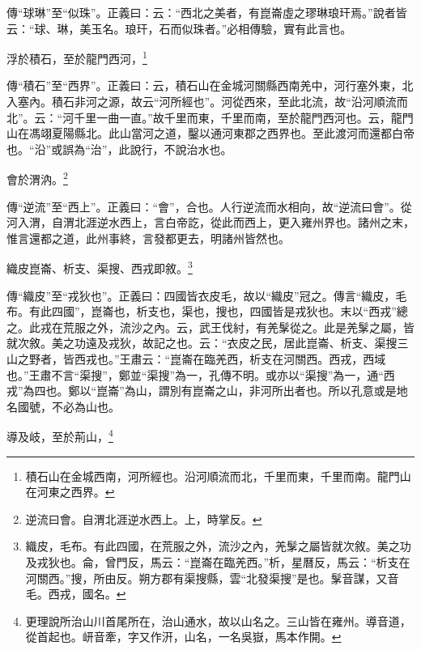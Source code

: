 {\noindent\zhuan{}\fzbyks 傳“球琳”至“似珠”。正義曰：云：“西北之美者，有崑崙虛之璆琳琅玕焉。”說者皆云：“球、琳，美玉名。琅玕，石而似珠者。”必相傳驗，實有此言也。 \par}

浮於積石，至於龍門西河，\footnote{積石山在金城西南，河所經也。沿河順流而北，千里而東，千里而南。龍門山在河東之西界。}

{\noindent\zhuan{}\fzbyks 傳“積石”至“西界”。正義曰：云，積石山在金城河關縣西南羌中，河行塞外東，北入塞內。積石非河之源，故云“河所經也”。河從西來，至此北流，故“沿河順流而北”。云：“河千里一曲一直。”故千里而東，千里而南，至於龍門西河也。云，龍門山在馮翊夏陽縣北。此山當河之道，鑿以通河東郡之西界也。至此渡河而還都白帝也。“沿”或誤為“治”，此說行，不說治水也。 \par}

會於渭汭。\footnote{逆流曰會。自渭北涯逆水西上。上，時掌反。}

{\noindent\zhuan{}\fzbyks 傳“逆流”至“西上”。正義曰：“會”，合也。人行逆流而水相向，故“逆流曰會”。從河入渭，自渭北涯逆水西上，言白帝訖，從此而西上，更入雍州界也。諸州之末，惟言還都之道，此州事終，言發都更去，明諸州皆然也。 \par}

織皮崑崙、析支、渠搜、西戎即敘。\footnote{織皮，毛布。有此四國，在荒服之外，流沙之內，羌髳之屬皆就次敘。美之功及戎狄也。侖，曾門反，馬云：“崑崙在臨羌西。”析，星曆反，馬云：“析支在河關西。”搜，所由反。朔方郡有渠搜縣，雲“北發渠搜”是也。髳音謀，又音毛。西戎，國名。}

{\noindent\zhuan{}\fzbyks 傳“織皮”至“戎狄也”。正義曰：四國皆衣皮毛，故以“織皮”冠之。傳言“織皮，毛布。有此四國”，崑崙也，析支也，渠也，搜也，四國皆是戎狄也。末以“西戎”總之。此戎在荒服之外，流沙之內。云，武王伐紂，有羌髳從之。此是羌髳之屬，皆就次敘。美之功遠及戎狄，故記之也。云：“衣皮之民，居此崑崙、析支、渠搜三山之野者，皆西戎也。”王肅云：“崑崙在臨羌西，析支在河關西。西戎，西域也。”王肅不言“渠搜”，鄭並“渠搜”為一，孔傳不明。或亦以“渠搜”為一，通“西戎”為四也。鄭以“崑崙”為山，謂別有崑崙之山，非河所出者也。所以孔意或是地名國號，不必為山也。 \par}

導及岐，至於荊山，\footnote{更理說所治山川首尾所在，治山通水，故以山名之。三山皆在雍州。導音道，從首起也。岍音牽，字又作汧，山名，一名吳嶽，馬本作開。}


